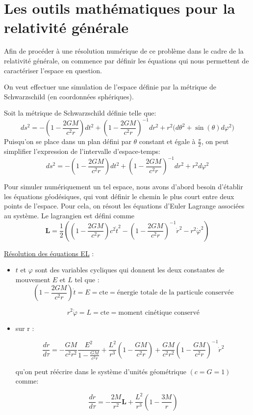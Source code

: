 \documentclass{article}
\begin{document}
\section{Les outils mathématiques pour la relativité générale}

Afin de procéder à une résolution numérique de ce problème dans le cadre de la relativité générale, on commence par définir les équations qui nous permettent de caractériser l’espace en question.\\ \vspace{-1em}

On veut effectuer une simulation de l’espace définie par la métrique de Schwarzschild (en coordonnées sphériques). \\ \vspace{-1em}

Soit la métrique de Schwarzschild définie telle que:
\[ ds^2 = -\left(1-\frac{2GM}{c^2r}\right)dt^2+\left(1-\frac{2GM}{c^2r}\right)^{-1}dr^2+r^2\big(d\theta ^2 +\sin(\theta)d\varphi^2\big)\]
Puisqu’on se place dans un plan défini par $\theta$ constant et égale à $\frac{\pi}{2}$, on peut simplifier l’expression de l'intervalle d'espace-temps:
\[ ds^2 = -\left(1-\frac{2GM}{c^2r}\right)dt^2+\left(1-\frac{2GM}{c^2r}\right)^{-1}dr^2+r^2d\varphi^2\]

Pour simuler numériquement un tel espace, nous avons d’abord besoin d'établir les équations géodésiques, qui vont définir le chemin le plus court entre deux points de l’espace. Pour cela, on résout les équations d’Euler Lagrange associées au système. Le lagrangien est défini comme
\[\mathbf L=\frac{1}{2}\left(\left(1-\frac{2GM}{c^2r}\right)c^2\dot t^2-\left(1-\frac{2GM}{c^2r}\right)^{-1}\dot r^2 - r^2\dot \varphi^2\right)\]

\newpage

\underline{Résolution des équations EL} :
\begin{itemize}[label=\textendash]
    \item $t$ et $\varphi$ sont des variables cycliques qui donnent les deux constantes de mouvement $E$ et $L$ tel que : 
    \begin{equation}\label{eq:1}\left(1-\frac{2GM}{c^2r}\right)\dot t = E = \text{cte}=\text{énergie totale de la particule conservée}\end{equation}\vspace{-2em}

    \begin{equation}\label{eq:2}r^2\dot \varphi = L = \text{cte}=\text{moment cinétique conservé}\end{equation}
    \item sur r : 

    \[\frac{d\dot r}{d\tau}=-\frac{GM}{c^2r^2}\frac{E^2}{1-\frac{GM}{c^2r}}+\frac{L^2}{r^3}\left(1-\frac{GM}{c^2r}\right)+\frac{GM}{c^2r^2}\left(1-\frac{GM}{c^2r}\right)^{-1}\dot r^2\]
      
    qu'on peut réécrire dans le système d'unités géométrique $(c=G=1)$ comme: 
    
    \[\frac{d\dot r}{d\tau}=-\frac{2M}{r^2}\mathbf{L}+\frac{L^2}{r^3}\left(1-\frac{3M}{r}\right)\]
\end{itemize}
\end{document}
